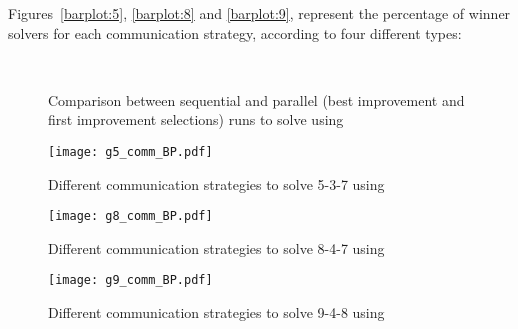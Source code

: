 Figures~\ref{barplot:5}, \ref{barplot:8} and \ref{barplot:9}, represent the percentage of winner solvers for each communication strategy, according to four different types:


\begin{figure}[!h]
\centering
{}\hspace{0.05\linewidth}
\\
\caption[]{Comparison between sequential and parallel (best improvement and first improvement selections) runs to solve \SGP{} using \posl}
\label{fig:boxplot_sel}
\end{figure}

\begin{figure}[!h]
\centering
\texttt{[image: g5\_comm\_BP.pdf]}
\caption{Different communication strategies to solve \SGP{} 5-3-7 using \posl}\label{boxplot:5comm}
\end{figure}

\begin{figure}[!h]
\centering
\texttt{[image: g8\_comm\_BP.pdf]}
\caption{Different communication strategies to solve \SGP{} 8-4-7 using \posl}\label{boxplot:8comm}
\end{figure}

\begin{figure}[!h]
\centering
\texttt{[image: g9\_comm\_BP.pdf]}
\caption{Different communication strategies to solve \SGP{} 9-4-8 using \posl}\label{boxplot:9comm}
\end{figure}

